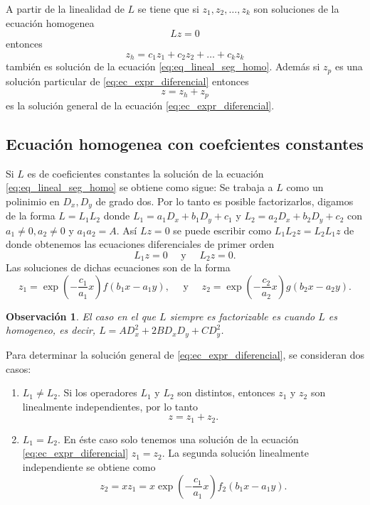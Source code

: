\documentclass[11pt,letterpaper]{report}
\newtheorem{obs}[defn]{Observación}
\newcommand\<{\langle}
\renewcommand\>{\rangle}
\begin{document}
A partir de la linealidad de $L$ se tiene que si
$z_1,z_2,\ldots,z_k$ son soluciones de la ecuación homogenea
\begin{equation}
  \label{eq:eq_lineal_seg_homo}
  Lz = 0
\end{equation}
entonces 
\[
z_h = c_1 z_1 + c_2 z_2 + \ldots + c_k z_k
\] 
también es solución de la ecuación \ref{eq:eq_lineal_seg_homo}.
Además si $z_p$ es una solución particular de
\ref{eq:ec_expr_diferencial} entonces
\[
z = z_h + z_p
\] 
es la solución general de la ecuación
\ref{eq:ec_expr_diferencial}.

\subsection{Ecuación homogenea con coefcientes constantes}

Si $L$ es de coeficientes constantes la solución de la
ecuación \ref{eq:eq_lineal_seg_homo} se obtiene como sigue:
Se trabaja a $L$ como un polinimio en $D_x, D_y$ de grado
dos. Por lo tanto es posible factorizarlos, digamos de la
forma $L = L_1 L_2$ donde $L_1 = a_1 D_x + b_1 D_y + c_1$ y
$L_2 = a_2 D_x + b_2 D_y + c_2$ con $a_1 \neq 0, a_2 \neq
0$ y $a_1 a_2 = A$. Así $L z = 0$ se puede escribir como
$L_1 L_2 z = L_2 L_1 z$ de donde obtenemos las ecuaciones
diferenciales de primer orden
\[
L_1 z = 0 \quad \text{ y } \quad L_2 z = 0.
\] 
Las soluciones de dichas ecuaciones son de la forma
\[
z_1 = \exp\left(-\frac{c_1}{a_1} x\right) f(b_1x-a_1y),
\quad \text{ y } \quad z_2 = \exp\left(-\frac{c_2}{a_2}
  x\right) g(b_2x - a_2y).
\] 
\begin{obs}
  El caso en el que $L$ siempre es factorizable es cuando $L$
  es homogeneo, es decir, $L = AD_x^2 + 2BD_xD_y + CD_y^2$. 
\end{obs}
Para determinar la solución general de
\ref{eq:ec_expr_diferencial}, se consideran dos casos:
\begin{enumerate}
  \item $L_1 \neq L_2$. Si los operadores $L_1$ y $L_2$ son
    distintos, entonces $z_1$ y $z_2$ son linealmente
    independientes, por lo tanto
    \[
    z = z_1 + z_2.
    \] 
  \item $L_1 = L_2$. En éste caso solo tenemos una solución
    de la ecuación \ref{eq:ec_expr_diferencial} $z_1 = z_2$.
    La segunda solución linealmente independiente se obtiene
    como
    \[
    z_2 = x z_1 = x \exp\left(-\frac{c_1}{a_1} x\right)
    f_2(b_1x - a_1y).
    \] 
\end{enumerate}
\end{document}
